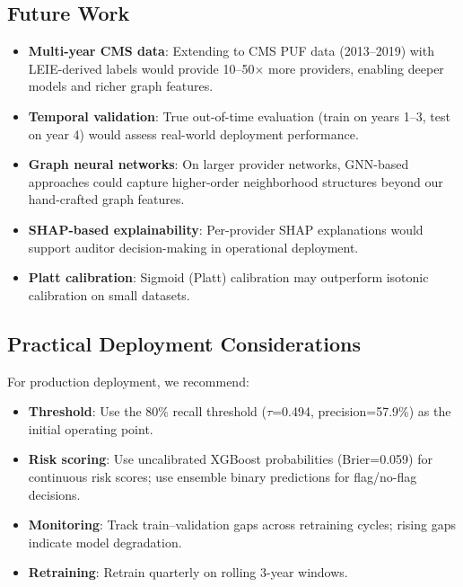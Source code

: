 \documentclass[conference]{IEEEtran}
\begin{document}
\subsection{Future Work}

\begin{itemize}[leftmargin=*]
    \item \textbf{Multi-year CMS data}: Extending to CMS PUF data (2013--2019) with LEIE-derived labels \cite{herland2018} would provide 10--50$\times$ more providers, enabling deeper models and richer graph features.
    \item \textbf{Temporal validation}: True out-of-time evaluation (train on years 1--3, test on year 4) would assess real-world deployment performance.
    \item \textbf{Graph neural networks}: On larger provider networks, GNN-based approaches could capture higher-order neighborhood structures beyond our hand-crafted graph features.
    \item \textbf{SHAP-based explainability}: Per-provider SHAP explanations would support auditor decision-making in operational deployment.
    \item \textbf{Platt calibration}: Sigmoid (Platt) calibration may outperform isotonic calibration on small datasets.
\end{itemize}

\subsection{Practical Deployment Considerations}

For production deployment, we recommend:
\begin{itemize}[leftmargin=*]
    \item \textbf{Threshold}: Use the 80\% recall threshold ($\tau$=0.494, precision=57.9\%) as the initial operating point.
    \item \textbf{Risk scoring}: Use uncalibrated XGBoost probabilities (Brier=0.059) for continuous risk scores; use ensemble binary predictions for flag/no-flag decisions.
    \item \textbf{Monitoring}: Track train--validation gaps across retraining cycles; rising gaps indicate model degradation.
    \item \textbf{Retraining}: Retrain quarterly on rolling 3-year windows.
\end{itemize}

\end{document}

